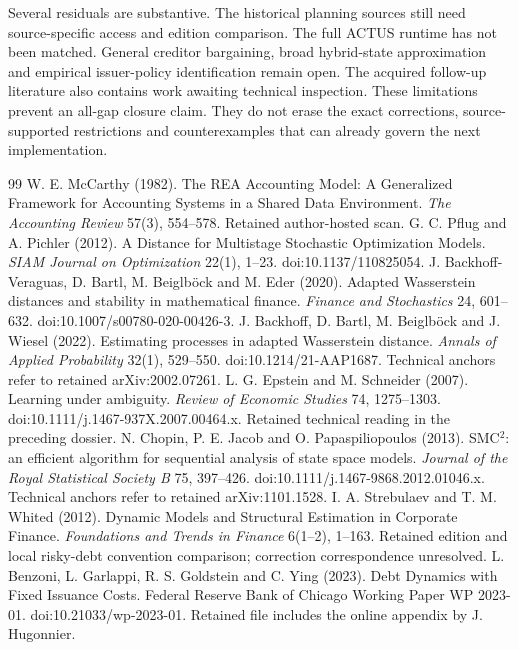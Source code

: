 \documentclass[11pt,a4paper]{article}
\begin{document}
Several residuals are substantive. The historical planning sources still
need source-specific access and edition comparison. The full ACTUS runtime
has not been matched. General creditor bargaining, broad hybrid-state
approximation and empirical issuer-policy identification remain open.
The acquired follow-up literature also contains work awaiting technical
inspection. These limitations prevent an all-gap closure claim. They do not
erase the exact corrections, source-supported restrictions and counterexamples
that can already govern the next implementation.

\begingroup
\raggedright
\begin{thebibliography}{99}
 W. E. McCarthy (1982). The REA Accounting Model: A Generalized Framework for Accounting Systems in a Shared Data Environment. \emph{The Accounting Review} 57(3), 554--578. Retained author-hosted scan.
 G. C. Pflug and A. Pichler (2012). A Distance for Multistage Stochastic Optimization Models. \emph{SIAM Journal on Optimization} 22(1), 1--23. doi:10.1137/110825054.
 J. Backhoff-Veraguas, D. Bartl, M. Beiglböck and M. Eder (2020). Adapted Wasserstein distances and stability in mathematical finance. \emph{Finance and Stochastics} 24, 601--632. doi:10.1007/s00780-020-00426-3.
 J. Backhoff, D. Bartl, M. Beiglböck and J. Wiesel (2022). Estimating processes in adapted Wasserstein distance. \emph{Annals of Applied Probability} 32(1), 529--550. doi:10.1214/21-AAP1687. Technical anchors refer to retained arXiv:2002.07261.
 L. G. Epstein and M. Schneider (2007). Learning under ambiguity. \emph{Review of Economic Studies} 74, 1275--1303. doi:10.1111/j.1467-937X.2007.00464.x. Retained technical reading in the preceding dossier.
 N. Chopin, P. E. Jacob and O. Papaspiliopoulos (2013). SMC$^2$: an efficient algorithm for sequential analysis of state space models. \emph{Journal of the Royal Statistical Society B} 75, 397--426. doi:10.1111/j.1467-9868.2012.01046.x. Technical anchors refer to retained arXiv:1101.1528.
 I. A. Strebulaev and T. M. Whited (2012). Dynamic Models and Structural Estimation in Corporate Finance. \emph{Foundations and Trends in Finance} 6(1--2), 1--163. Retained edition and local risky-debt convention comparison; correction correspondence unresolved.
 L. Benzoni, L. Garlappi, R. S. Goldstein and C. Ying (2023). Debt Dynamics with Fixed Issuance Costs. Federal Reserve Bank of Chicago Working Paper WP 2023-01. doi:10.21033/wp-2023-01. Retained file includes the online appendix by J. Hugonnier.

\end{thebibliography}
\end{document}
